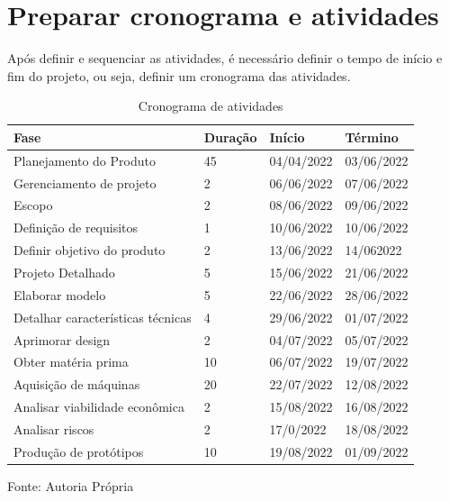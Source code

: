\documentclass[
	12pt,				%
	openright,			%
	oneside,			%
	a4paper,			%
	english,			%
	french,				%
	spanish,			%
	brazil				%
	]{abntex2}
\begin{document}
\section{Preparar cronograma e atividades}

Após definir e sequenciar as atividades, é necessário definir o tempo de início e fim do projeto, ou seja, definir um cronograma das atividades.

\begin{center}
\begin{longtable}[c]{|l|l|l|l|}
\caption{Cronograma de atividades}
\label{tableproduto3}\\
\hline
\rowcolor[HTML]{9FC5E8} 
\textbf{Fase}                     & \textbf{Duração} & \textbf{Início} & \textbf{Término} \\ \hline
\endhead
%
Planejamento do Produto           & 45               & 04/04/2022      & 03/06/2022       \\ \hline
Gerenciamento de projeto          & 2                & 06/06/2022      & 07/06/2022       \\ \hline
Escopo                            & 2                & 08/06/2022      & 09/06/2022       \\ \hline
Definição de requisitos           & 1                & 10/06/2022      & 10/06/2022       \\ \hline
Definir objetivo do produto       & 2                & 13/06/2022      & 14/062022        \\ \hline
Projeto Detalhado                 & 5                & 15/06/2022      & 21/06/2022       \\ \hline
Elaborar modelo                   & 5                & 22/06/2022      & 28/06/2022       \\ \hline
Detalhar características técnicas & 4                & 29/06/2022      & 01/07/2022       \\ \hline
Aprimorar design                  & 2                & 04/07/2022      & 05/07/2022       \\ \hline
Obter matéria prima               & 10               & 06/07/2022      & 19/07/2022       \\ \hline
Aquisição de máquinas             & 20               & 22/07/2022      & 12/08/2022       \\ \hline
Analisar viabilidade econômica    & 2                & 15/08/2022      & 16/08/2022       \\ \hline
Analisar riscos                   & 2                & 17/0/2022       & 18/08/2022       \\ \hline
Produção de protótipos            & 10               & 19/08/2022      & 01/09/2022       \\ \hline
\end{longtable}
\centering \footnotesize{Fonte: Autoria Própria}
\end{center}
\end{document}
